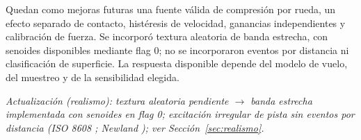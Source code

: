 Quedan como mejoras futuras una fuente válida de compresión por rueda, un efecto separado de contacto, histéresis de velocidad, ganancias independientes y calibración de fuerza. Se incorporó textura aleatoria de banda estrecha, con senoides disponibles mediante flag 0; no se incorporaron eventos por distancia ni clasificación de superficie. La respuesta disponible depende del modelo de vuelo, del muestreo y de la sensibilidad elegida.
\newpage

\textit{Actualización (realismo): textura aleatoria pendiente $\rightarrow$ banda estrecha implementada con senoides en flag 0; excitación irregular de pista sin eventos por distancia (ISO 8608 \cite{iso8608}; Newland \cite{newland1993}); ver Sección~\ref{sec:realismo}.}

